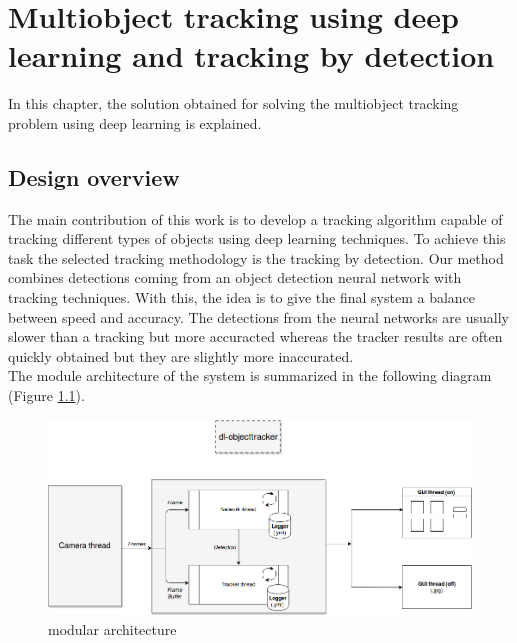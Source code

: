 \chapter{Multiobject tracking using deep learning and tracking by detection}
In this chapter, the solution obtained for solving the multiobject tracking problem using deep learning is explained.

\section{Design overview}
The main contribution of this work is to develop a tracking algorithm capable of tracking different types of objects using deep learning techniques. To achieve this task the selected tracking methodology is the tracking by detection. Our method combines detections coming from an object detection neural network with tracking techniques. With this, the idea is to give the final system a balance between speed and accuracy. The detections from the neural networks are usually slower than a tracking but more accuracted whereas the tracker results are often quickly obtained but they are slightly more inaccurated.\\
The module architecture of the system is summarized in the following diagram (Figure \ref{fig:general}).
\begin{figure}[H]
\begin{center}
\includegraphics[scale=0.4]{figures/general.png}
\caption{modular architecture}
\label{fig:general}
\end{center}
\end{figure}

